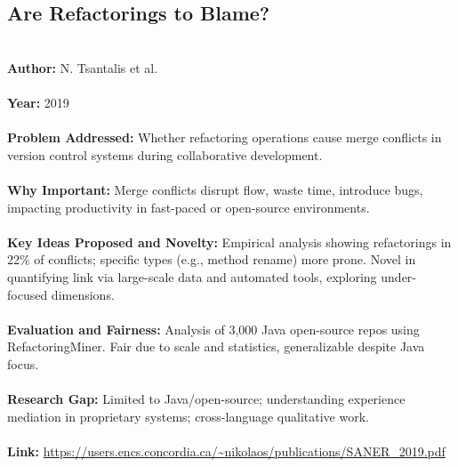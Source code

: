 \documentclass[12pt]{article}
\begin{document}
\subsection*{Are Refactorings to Blame?}
\\
\textbf{Author:} N. Tsantalis et al. \\
\\
\textbf{Year:} 2019 \\
\\
\textbf{Problem Addressed:} Whether refactoring operations cause merge conflicts in version control systems during collaborative development. \\
\\
\textbf{Why Important:} Merge conflicts disrupt flow, waste time, introduce bugs, impacting productivity in fast-paced or open-source environments. \\
\\
\textbf{Key Ideas Proposed and Novelty:} Empirical analysis showing refactorings in 22\% of conflicts; specific types (e.g., method rename) more prone. Novel in quantifying link via large-scale data and automated tools, exploring under-focused dimensions. \\
\\
\textbf{Evaluation and Fairness:} Analysis of 3,000 Java open-source repos using RefactoringMiner. Fair due to scale and statistics, generalizable despite Java focus. \\
\\
\textbf{Research Gap:} Limited to Java/open-source; understanding experience mediation in proprietary systems; cross-language qualitative work. \\
\\
\textbf{Link:} \url{https://users.encs.concordia.ca/~nikolaos/publications/SANER_2019.pdf}
\pagebreak

\end{document}
